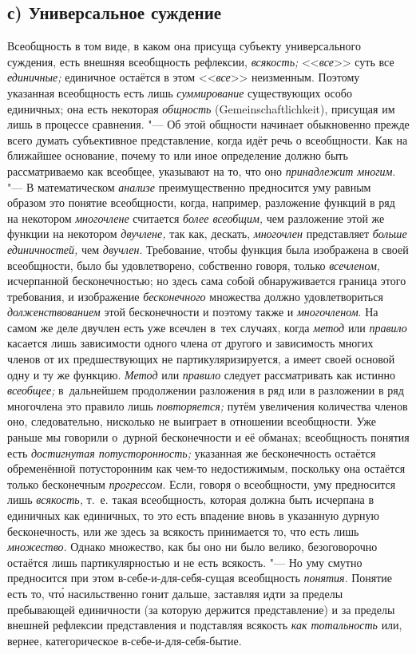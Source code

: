 \subsection[с) Универсальное суждение]{с) Универсальное суждение}

Всеобщность в том виде, в каком она присуща субъекту
универсального суждения, есть внешняя всеобщность рефлексии,
{\em всякость;} <<{\em все}>> суть все {\em единичные;}
единичное остаётся в этом <<{\em все}>> неизменным.
Поэтому указанная всеобщность есть лишь {\em суммирование}
существующих особо единичных; она есть некоторая
{\em общность} (Gemein\-schaft\-lich\-keit),
присущая им лишь в процессе сравнения. "--- Об
этой общности начинает обыкновенно прежде всего думать субъективное
представление, когда идёт речь о всеобщности. Как на
ближайшее основание, почему то или иное определение должно быть
рассматриваемо как всеобщее, указывают на то, что оно
{\em принадлежит многим}. "--- В математическом {\em анализе}
преимущественно предносится уму равным образом это понятие
всеобщности, когда, например, разложение функций в ряд на некотором
{\em многочлене} считается {\em более всеобщим,} чем разложение этой же функции
на некотором {\em двучлене,} так как, дескать, {\em многочлен} представляет
{\em больше единичностей,} чем {\em двучлен}. Требование, чтобы функция была
изображена в своей всеобщности, было бы удовлетворено, собственно говоря,
только {\em всечленом,} исчерпанной бесконечностью; но здесь сама собой
обнаруживается граница этого требования, и изображение {\em бесконечного}
множества должно удовлетвориться {\em долженствованием} этой бесконечности и
поэтому также и {\em многочленом}. На самом же деле двучлен есть уже всечлен
в~тех случаях, когда {\em метод} или {\em правило} касается лишь зависимости
одного члена от другого и зависимость многих членов от их предшествующих не
партикуляризируется, а имеет своей основой одну и ту же функцию. {\em Метод}
или {\em правило} следует рассматривать как истинно {\em всеобщее;}
в~дальнейшем продолжении разложения в ряд или в разложении в ряд многочлена
это правило лишь {\em повторяется;} путём увеличения количества членов оно,
следовательно, нисколько не выиграет в отношении всеобщности. Уже раньше мы
говорили о~дурной бесконечности и её обманах; всеобщность понятия есть
{\em достигнутая потусторонность;} указанная же бесконечность остаётся
обременённой потусторонним как чем-то недостижимым, поскольку она остаётся
только бесконечным {\em прогрессом}. Если, говоря о всеобщности, уму
предносится лишь {\em всякость,} т.~е. такая всеобщность, которая должна быть
исчерпана в единичных как единичных, то это есть впадение вновь в указанную
дурную бесконечность, или же здесь за всякость принимается то, что есть лишь
{\em множество}. Однако множество, как бы оно ни было велико, безоговорочно
остаётся лишь партикулярностью и не есть всякость. "--- Но уму смутно
предносится при этом в-себе-и-для-себя-сущая всеобщность {\em понятия}. Понятие
есть то, чт\'{о} насильственно гонит дальше, заставляя идти за пределы пребывающей
единичности (за которую держится представление) и за пределы внешней рефлексии
представления и подставляя всякость {\em как тотальность} или, вернее,
категорическое в-себе-и-для-себя-бытие.

